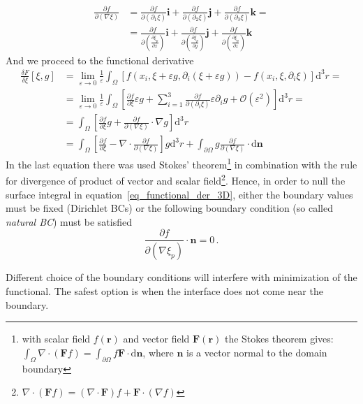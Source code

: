 \begin{equation}
	\begin{split}
		\frac{\partial f}{\partial(\nabla \xi)} &= \frac{\partial f}{\partial(\partial_1\xi)}\mathbf{i} + \frac{\partial f}{\partial(\partial_2\xi)}\mathbf{j} +\frac{\partial f}{\partial(\partial_3\xi)}\mathbf{k} = \\
		&= \frac{\partial f}{\partial(\frac{\partial \xi_p}{\partial x})}\mathbf{i} + \frac{\partial f}{\partial(\frac{\partial \xi_p}{\partial y})}\mathbf{j} +\frac{\partial f}{\partial(\frac{\partial \xi_p}{\partial z})}\mathbf{k}
	\end{split}
\end{equation}
And we proceed to the functional derivative
\begin{equation}
	\begin{split}\label{eq_functional_der_3D}
		\frac{\delta F}{\delta \xi}[\xi,g] &= \lim_{\varepsilon\rightarrow0}\frac{1}{\varepsilon}\int_\Omega [f(x_i,\xi+\varepsilon g,\partial_i(\xi+\varepsilon g))-f(x_i,\xi,\partial_i\xi) ]\mathrm{d}^3r = \\
		&= \lim_{\varepsilon\rightarrow0}\frac{1}{\varepsilon}\int_\Omega\left[\frac{\partial f}{\partial \xi}\varepsilon g + \sum_{i=1}^3\frac{\partial f}{\partial (\partial_i\xi)}\varepsilon \partial_i g + \mathcal{O}(\varepsilon^2)\right]\mathrm{d}^3r = \\
		&= \int_\Omega\left[\frac{\partial f}{\partial \xi} g + \frac{\partial f}{\partial (\nabla\xi)}\cdot \nabla g \right]\mathrm{d}^3r \\
		&= \int_\Omega\left[\frac{\partial f}{\partial \xi}  - \nabla\cdot\frac{\partial f}{\partial (\nabla\xi)}  \right]g\mathrm{d}^3r + \int_{\partial\Omega}g\frac{\partial f}{\partial (\nabla\xi)}\cdot\mathrm{d}\bm{n}
	\end{split}
\end{equation}
In the last equation there was used Stokes' theorem\footnote{with scalar field $f(\bm{r})$ and vector field $\bm{F}(\bm{r})$ the Stokes theorem gives: $\int_\Omega \nabla\cdot(\bm{F}f) = \int_{\partial\Omega} f\bm{F}\cdot\mathrm{d}\bm{n} $, where $\bm{n}$ is a vector normal to the domain boundary} in combination with the rule for divergence of product of vector and scalar field\footnote{ $\nabla\cdot(\bm{F}f) =  (\nabla\cdot\bm{F})f + \bm{F}\cdot(\nabla f)$}. Hence, in order to null the surface integral in equation~\ref{eq_functional_der_3D}, either the boundary values must be fixed (Dirichlet BCs) or the following boundary condition (so called \textit{natural BC}) must be satisfied
\begin{equation}
	\frac{\partial f}{\partial(\nabla \xi_p)}\cdot\bm{n}=0 \,.
\end{equation}

Different choice of the boundary conditions will interfere with minimization of the functional. The safest option is when the interface does not come near the boundary. 


\cleardoublepage

